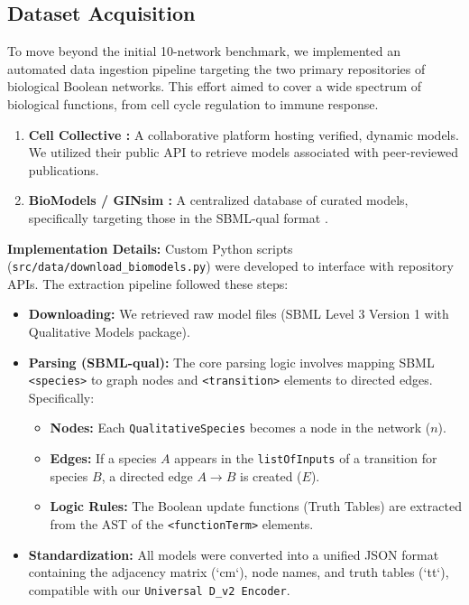 \documentclass[11pt]{article}
\begin{document}
\subsection{Dataset Acquisition}
To move beyond the initial 10-network benchmark, we implemented an automated data ingestion pipeline targeting the two primary repositories of biological Boolean networks. This effort aimed to cover a wide spectrum of biological functions, from cell cycle regulation to immune response.

\begin{enumerate}
    \item \textbf{Cell Collective \cite{helikar2012cell}:} A collaborative platform hosting verified, dynamic models. We utilized their public API to retrieve models associated with peer-reviewed publications.
    \item \textbf{BioModels / GINsim \cite{chelliah2015biomodels, naldi2009logical}:} A centralized database of curated models, specifically targeting those in the SBML-qual format \cite{chaouiya2013sbml}.
\end{enumerate}

\textbf{Implementation Details:}
Custom Python scripts (\texttt{src/data/download\_biomodels.py}) were developed to interface with repository APIs. The extraction pipeline followed these steps:
\begin{itemize}
    \item \textbf{Downloading:} We retrieved raw model files (SBML Level 3 Version 1 with Qualitative Models package).
    \item \textbf{Parsing (SBML-qual):} The core parsing logic involves mapping SBML \texttt{<species>} to graph nodes and \texttt{<transition>} elements to directed edges. Specifically:
    \begin{itemize}
        \item \textbf{Nodes:} Each \texttt{QualitativeSpecies} becomes a node in the network ($n$).
        \item \textbf{Edges:} If a species $A$ appears in the \texttt{listOfInputs} of a transition for species $B$, a directed edge $A \to B$ is created ($E$).
        \item \textbf{Logic Rules:} The Boolean update functions (Truth Tables) are extracted from the AST of the \texttt{<functionTerm>} elements.
    \end{itemize}
    \item \textbf{Standardization:} All models were converted into a unified JSON format containing the adjacency matrix (`cm`), node names, and truth tables (`tt`), compatible with our \texttt{Universal D\_v2 Encoder}.
\end{itemize}
\end{document}
